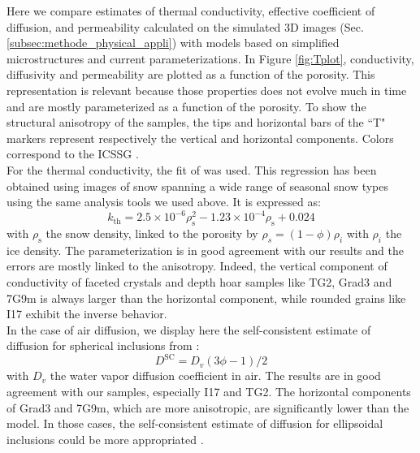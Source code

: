 \documentclass[draft,ms]{agujournal2019}
\begin{document}
Here we compare estimates of thermal conductivity, effective coefficient of diffusion, and permeability calculated on the simulated 3D images (Sec. \ref{subsec:methode_physical_appli}) with models based on simplified microstructures and current parameterizations. In Figure \ref{fig:Tplot}, conductivity, diffusivity and permeability are plotted as a function of the porosity. This representation is relevant because those properties does not evolve much in time and are mostly parameterized as a function of the porosity. To show the structural anisotropy of the samples, the tips and horizontal bars of the ``T" markers represent respectively the vertical and horizontal components. Colors correspond to the ICSSG \cite{fierz2009international}.\\
 
 For the thermal conductivity, the fit of  was used. This regression has been obtained using images of snow spanning a wide range of seasonal snow types using the same analysis tools we used above. It is expressed as:
\begin{equation}k_{\mathrm{th}}=2.5 \times 10^{-6} \rho_{\mathrm{s}}^{2}-1.23 \times 10^{-4} \rho_{\mathrm{s}}+0.024\end{equation}
with $\rho_{\mathrm{s}}$ the snow density, linked to the porosity by $\rho_s = (1 - \phi)\rho_i$ with $\rho_i$ the ice density.
The parameterization is in good agreement with our results and the errors are mostly linked to the anisotropy. Indeed, the vertical component of conductivity of faceted crystals and depth hoar samples like TG2, Grad3 and 7G9m is always larger than the horizontal component, while rounded grains like I17 exhibit the inverse behavior.\\

In the case of air diffusion, we display here the self-consistent estimate of diffusion for spherical inclusions from :
\begin{equation}
    D^{\mathrm{SC}} = D_v(3\phi - 1)/2
\end{equation}
with $D_v$ the water vapor diffusion coefficient in air. The results are in good agreement with our samples, especially I17 and TG2. The horizontal components of Grad3 and 7G9m, which are more anisotropic, are significantly lower than the model. In those cases, the self-consistent estimate of diffusion for ellipsoidal inclusions could be more appropriated \cite{calonne_numerical_2011}.\\
\end{document}
